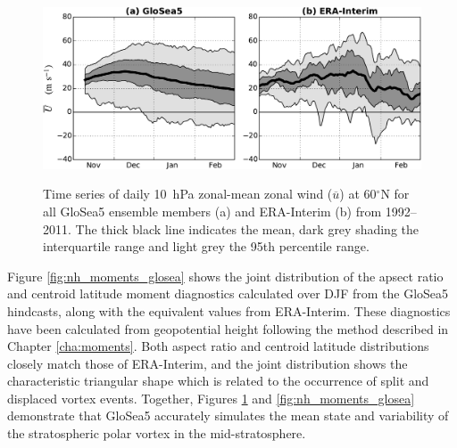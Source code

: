 \begin{figure}[t]
  \noindent\includegraphics[width=\textwidth,angle=0]{figures/chapter-seasonal/zmzw_climatologies_nh.pdf}\\
  \caption[NH comparison of GloSea5 and ERA-Interim $\overline{u}$]{Time series
    of daily 10~hPa zonal-mean zonal wind ($\overline{u}$) at 60$^{\circ}$N for
    all GloSea5 ensemble members (a) and ERA-Interim (b) from 1992--2011. The
    thick black line indicates the mean, dark grey shading the interquartile
    range and light grey the 95th percentile range.}\label{fig:nh_zmzw_clim}
\end{figure}

Figure \ref{fig:nh_moments_glosea} shows the joint distribution of the apsect
ratio and centroid latitude moment diagnostics calculated over DJF from the
GloSea5 hindcasts, along with the equivalent values from ERA-Interim. These
diagnostics have been calculated from geopotential height following the method
described in Chapter \ref{cha:moments}. Both aspect ratio and centroid latitude
distributions closely match those of ERA-Interim, and the joint distribution
shows the characteristic triangular shape which is related to the occurrence of
split and displaced vortex events. Together, Figures \ref{fig:nh_zmzw_clim} and
\ref{fig:nh_moments_glosea} demonstrate that GloSea5 accurately simulates the
mean state and variability of the stratospheric polar vortex in the
mid-stratosphere.  

